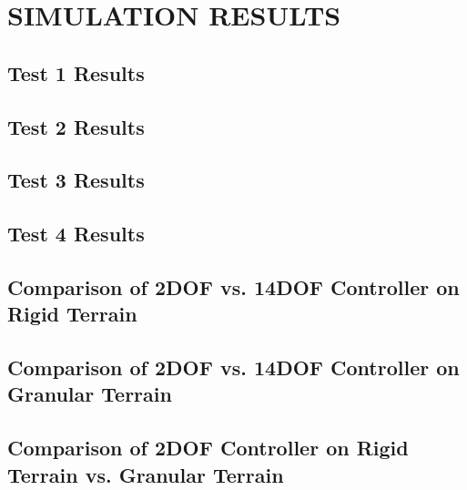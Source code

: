 \documentclass[12pt,twocolumn]{article}
\begin{document}

\section{SIMULATION RESULTS}\label{s:results}

\subsection{Test 1 Results}\label{ss:Test1}


\subsection{Test 2 Results}\label{ss:Test2}


\subsection{Test 3 Results}\label{ss:Test3}


\subsection{Test 4 Results}\label{ss:Test4}


\subsection{Comparison of 2DOF vs. 14DOF Controller on Rigid Terrain }\label{ss:Comp1}


\subsection{Comparison of 2DOF vs. 14DOF Controller on Granular Terrain }\label{ss:Comp2}


\subsection{Comparison of 2DOF Controller on Rigid Terrain vs. Granular Terrain}\label{ss:Comp3}
\end{document}
